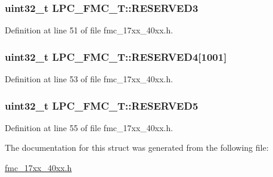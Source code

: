 \subsubsection[{\texorpdfstring{R\+E\+S\+E\+R\+V\+E\+D3}{RESERVED3}}]{ uint32\+\_\+t L\+P\+C\+\_\+\+F\+M\+C\+\_\+\+T\+::\+R\+E\+S\+E\+R\+V\+E\+D3}\hypertarget{structLPC__FMC__T_a75dead6dac33f1333655320d02576d6e}{}\label{structLPC__FMC__T_a75dead6dac33f1333655320d02576d6e}


Definition at line 51 of file fmc\+\_\+17xx\+\_\+40xx.\+h.

\subsubsection[{\texorpdfstring{R\+E\+S\+E\+R\+V\+E\+D4}{RESERVED4}}]{ uint32\+\_\+t L\+P\+C\+\_\+\+F\+M\+C\+\_\+\+T\+::\+R\+E\+S\+E\+R\+V\+E\+D4\mbox{[}1001\mbox{]}}\hypertarget{structLPC__FMC__T_a3562f9575288974c373fd78283ac56a1}{}\label{structLPC__FMC__T_a3562f9575288974c373fd78283ac56a1}


Definition at line 53 of file fmc\+\_\+17xx\+\_\+40xx.\+h.

\subsubsection[{\texorpdfstring{R\+E\+S\+E\+R\+V\+E\+D5}{RESERVED5}}]{ uint32\+\_\+t L\+P\+C\+\_\+\+F\+M\+C\+\_\+\+T\+::\+R\+E\+S\+E\+R\+V\+E\+D5}\hypertarget{structLPC__FMC__T_a374b0f7e9083f242ad88ed5e83202636}{}\label{structLPC__FMC__T_a374b0f7e9083f242ad88ed5e83202636}


Definition at line 55 of file fmc\+\_\+17xx\+\_\+40xx.\+h.



The documentation for this struct was generated from the following file\+:\begin{DoxyCompactItemize}
\item 
\hyperlink{fmc__17xx__40xx_8h}{fmc\+\_\+17xx\+\_\+40xx.\+h}\end{DoxyCompactItemize}
